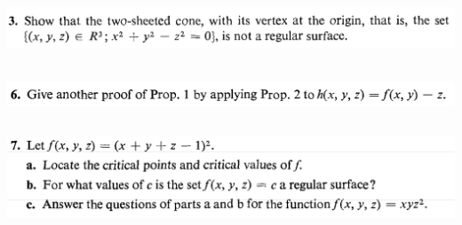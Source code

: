 \documentclass{report}
\begin{document}
\begin{question}{}{}
\includegraphics[height=2cm,width=18cm]{hw2q9}
\end{question}
\begin{question}{}{}
\includegraphics[height=1cm,width=18cm]{hw2q8}
\end{question}
\begin{question}{}{}
\includegraphics[height=3cm,width=18cm]{hw2q7}
\end{question}
\end{document}
